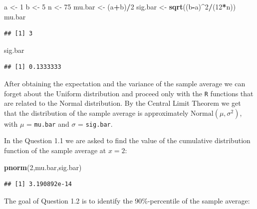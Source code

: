 \documentclass[
]{krantz}
\makeatletter
\newenvironment{Shaded}{\begin{snugshade}}{\end{snugshade}}
\newcommand{\DecValTok}[1]{\textcolor[rgb]{0.00,0.00,0.81}{#1}}
\newcommand{\KeywordTok}[1]{\textcolor[rgb]{0.13,0.29,0.53}{\textbf{#1}}}
\newcommand{\NormalTok}[1]{#1}
\newcommand{\OperatorTok}[1]{\textcolor[rgb]{0.81,0.36,0.00}{\textbf{#1}}}
\newcommand{\StringTok}[1]{\textcolor[rgb]{0.31,0.60,0.02}{#1}}
\newenvironment{kframe}{%
\medskip{}
\setlength{\fboxsep}{.8em}
 \def\at@end@of@kframe{}%
 \ifinner\ifhmode%
  \def\at@end@of@kframe{\end{minipage}}%
  \begin{minipage}{\columnwidth}%
 \fi\fi%
 \def\FrameCommand##1{\hskip\@totalleftmargin \hskip-\fboxsep
 \colorbox{shadecolor}{##1}\hskip-\fboxsep
     \hskip-\linewidth \hskip-\@totalleftmargin \hskip\columnwidth}%
 \MakeFramed {\advance\hsize-\width
   \@totalleftmargin\z@ \linewidth\hsize
   \@setminipage}}%
 {\par\unskip\endMakeFramed%
 \at@end@of@kframe}
\renewenvironment{Shaded}{\begin{kframe}}{\end{kframe}}
\theoremstyle{definition}
\theoremstyle{definition}
\theoremstyle{definition}
\theoremstyle{remark}
\makeatother
\begin{document}
\begin{Shaded}
\begin{Highlighting}[]
\NormalTok{a <-}\StringTok{ }\DecValTok{1}
\NormalTok{b <-}\StringTok{ }\DecValTok{5}
\NormalTok{n <-}\StringTok{ }\DecValTok{75}
\NormalTok{mu.bar <-}\StringTok{ }\NormalTok{(a}\OperatorTok{+}\NormalTok{b)}\OperatorTok{/}\DecValTok{2}
\NormalTok{sig.bar <-}\StringTok{ }\KeywordTok{sqrt}\NormalTok{((b}\OperatorTok{-}\NormalTok{a)}\OperatorTok{^}\DecValTok{2}\OperatorTok{/}\NormalTok{(}\DecValTok{12}\OperatorTok{*}\NormalTok{n))}
\NormalTok{mu.bar}
\end{Highlighting}
\end{Shaded}

\begin{verbatim}
## [1] 3
\end{verbatim}

\begin{Shaded}
\begin{Highlighting}[]
\NormalTok{sig.bar}
\end{Highlighting}
\end{Shaded}

\begin{verbatim}
## [1] 0.1333333
\end{verbatim}

After obtaining the expectation and the variance of the sample average
we can forget about the Uniform distribution and proceed only with the
\texttt{R} functions that are related to the Normal distribution. By the
Central Limit Theorem we get that the distribution of the sample average
is approximately \(\mathrm{Normal}(\mu, \sigma^2)\), with \(\mu\) = \texttt{mu.bar}
and \(\sigma\) = \texttt{sig.bar}.

In the Question 1.1 we are asked to find the value of the cumulative
distribution function of the sample average at \(x=2\):

\begin{Shaded}
\begin{Highlighting}[]
\KeywordTok{pnorm}\NormalTok{(}\DecValTok{2}\NormalTok{,mu.bar,sig.bar)}
\end{Highlighting}
\end{Shaded}

\begin{verbatim}
## [1] 3.190892e-14
\end{verbatim}

The goal of Question 1.2 is to identify the 90\%-percentile of the sample
average:
\end{document}
